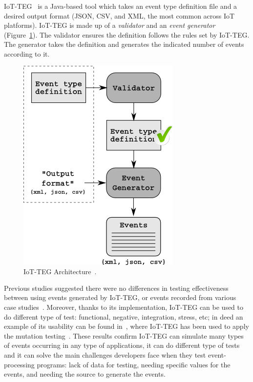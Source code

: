\documentclass[review]{elsarticle}
\begin{document}
IoT-TEG~\cite{TesisGutierrez2017,Gutierrez2017} is a Java-based tool which takes an event 
type definition file and a desired output format (JSON, CSV, and XML, the most common across 
IoT platforms). IoT-TEG is made up of a \emph{validator} and an \emph{event generator} 
(Figure~\ref{fig:IoT-EGArquitecture}). The validator ensures the definition follows the rules set 
by IoT-TEG. The generator takes the definition and generates the indicated number of events according to it.

\begin{figure}[!ht]
  \centering
  \includegraphics[scale=0.5]{./img/IoT-EGArquitecture}
  \caption[IoT-TEG Architecture]{IoT-TEG Architecture~\cite{TesisGutierrez2017,Gutierrez2017}.}
  \label{fig:IoT-EGArquitecture}
\end{figure}

Previous studies suggested there were no differences in testing effectiveness between using events
generated by IoT-TEG, or events recorded from various case studies~\cite{TesisGutierrez2017,Gutierrez2017}.
Moreover, thanks to its implementation, IoT-TEG can be used to do different type of test: functional,
negative, integration, stress, etc; in deed an example of its usability can be found 
in~\cite{TesisGutierrez2017,gutierrez2018}, where IoT-TEG has been used to apply the mutation 
testing~\cite{jia2011}. These results confirm IoT-TEG can 
simulate many types of events occurring in any type of applications, it can do different type of tests
and it can solve the main challenges developers face when they test event-processing programs: lack of data 
for testing, needing specific values for the events, and needing the source to generate the events.
\end{document}
